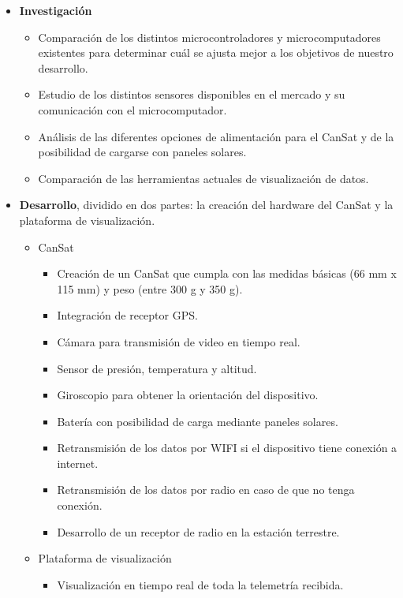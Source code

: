 \begin{itemize}
    \item \textbf{Investigación}
    \begin{itemize}
        \item Comparación de los distintos microcontroladores y microcomputadores existentes para determinar cuál se ajusta mejor a los objetivos de nuestro desarrollo.
        \item Estudio de los distintos sensores disponibles en el mercado y su comunicación con el microcomputador.
        \item Análisis de las diferentes opciones de alimentación para el CanSat y de la posibilidad de cargarse con paneles solares.
        \item Comparación de las herramientas actuales de visualización de datos.
    \end{itemize}
    \item \textbf{Desarrollo}, dividido en dos partes: la creación del hardware del CanSat y la plataforma de visualización.
    \begin{itemize}
        \item CanSat
        \begin{itemize}
            \item Creación de un CanSat que cumpla con las medidas básicas (66 mm x 115 mm) y peso (entre 300 g y 350 g).
            \item Integración de receptor GPS.
            \item Cámara para transmisión de video en tiempo real.
            \item Sensor de presión, temperatura y altitud.
            \item Giroscopio para obtener la orientación del dispositivo.
            \item Batería con posibilidad de carga mediante paneles solares.
            \item Retransmisión de los datos por WIFI si el dispositivo tiene conexión a internet.
            \item Retransmisión de los datos por radio en caso de que no tenga conexión.
            \item Desarrollo de un receptor de radio en la estación terrestre.
        \end{itemize}
        \item Plataforma de visualización
        \begin{itemize}
            \item Visualización en tiempo real de toda la telemetría recibida.

\end{itemize}
\end{itemize}
\end{itemize}
